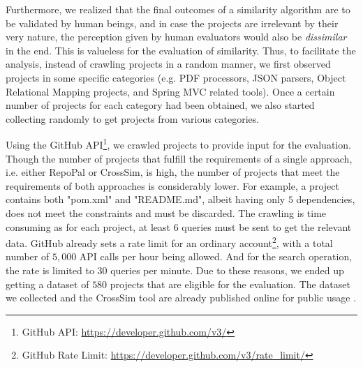 Furthermore, we realized that the final outcomes of a similarity algorithm are to be validated by human beings, and in case the projects are irrelevant by their very nature, the perception given by human evaluators would also be \emph{dissimilar} in the end. This is valueless for the evaluation of similarity. Thus, to facilitate the analysis, instead of crawling projects in a random manner, we first observed projects in some specific categories (e.g. PDF processors, JSON parsers, Object Relational Mapping projects, and Spring MVC related tools). Once a certain number of projects for each category had been obtained, we also started collecting randomly to get projects from various categories.

Using the GitHub API\footnote{GitHub API: \url{https://developer.github.com/v3/}}, we crawled projects to provide input for the evaluation. Though the number of projects that fulfill the requirements of a single approach, i.e. either RepoPal or CrossSim, is high, the number of projects that meet the requirements of both approaches is considerably lower. For example, a project contains both "pom.xml" and "README.md", albeit having only $5$ dependencies, does not meet the constraints and must be discarded. The crawling is time consuming as for each project, at least $6$ queries must be sent to get the relevant data. GitHub already sets a rate limit for an ordinary account\footnote{GitHub Rate Limit: \url{https://developer.github.com/v3/rate_limit/}}, with a total number of $5,000$ API calls per hour being allowed. And for the search operation, the rate is limited to $30$ queries per minute. Due to these reasons, we ended up getting a dataset of $580$ projects that are eligible for the evaluation. The dataset we collected and the CrossSim tool are already published online for public usage \cite{CROSSSIM-DATA}.




